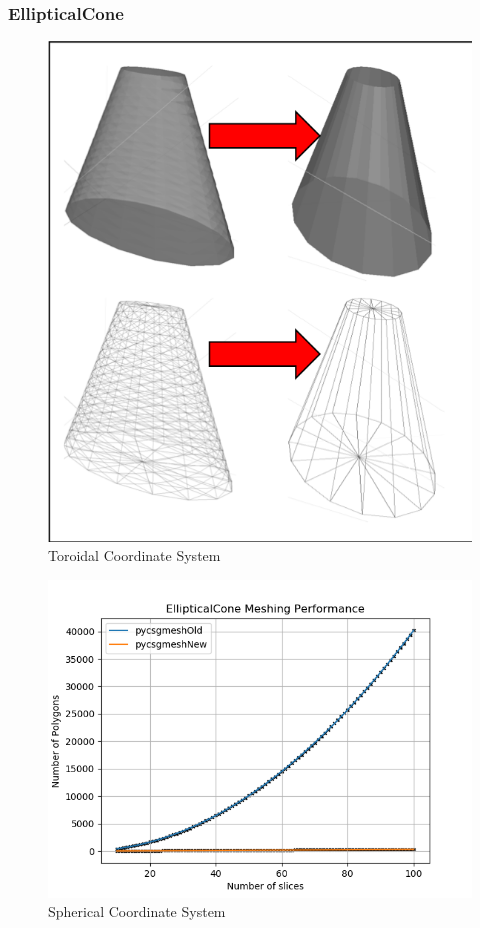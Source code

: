\documentclass[12pt,a4paper]{article}
\begin{document}
\subsubsection{EllipticalCone}

\begin{figure}[h!]
\centering
\includegraphics[scale=0.5]{Images//Meshes//ellipticalcone.png}
\caption[width=\columnwidth]{Toroidal Coordinate System}
\label{conts}
\end{figure}

\begin{figure}[h!]
\centering
\includegraphics[scale=0.5]{Images//Quad_fits//Ellipticalcone_quad.png}
\caption[width=\columnwidth]{Spherical Coordinate System}
\label{conts}
\end{figure}
\end{document}
